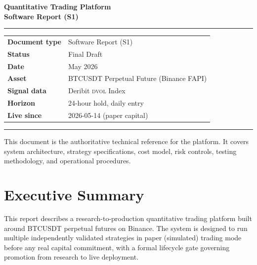 \documentclass[12pt, a4paper]{article}
\theoremstyle{definition}
\newcommand{\DVOL}{\textsc{dvol}}
\begin{document}
\onehalfspacing

\begin{titlepage}
\centering
\vspace*{2cm}

{\Huge\bfseries\color{deepblue}
    Quantitative Trading Platform\\[0.4em]
    \large Software Report (S1)
}

\vspace{1.5cm}
\rule{0.6\linewidth}{0.5pt}

\vspace{1cm}
{\large
\begin{tabular}{ll}
    \textbf{Document type}  & Software Report (S1) \\[4pt]
    \textbf{Status}         & Final Draft \\[4pt]
    \textbf{Date}           & May 2026 \\[4pt]
    \textbf{Asset}          & BTCUSDT Perpetual Future (Binance FAPI) \\[4pt]
    \textbf{Signal data}    & Deribit \DVOL{} Index \\[4pt]
    \textbf{Horizon}        & 24-hour hold, daily entry \\[4pt]
    \textbf{Live since}     & 2026-05-14 (paper capital) \\
\end{tabular}
}

\vspace{1.5cm}
\rule{0.6\linewidth}{0.5pt}
\vfill

{\small
This document is the authoritative technical reference for the platform.
It covers system architecture, strategy specifications, cost model,
risk controls, testing methodology, and operational procedures.
}
\end{titlepage}

\tableofcontents
\newpage

\section{Executive Summary}

This report describes a research-to-production quantitative trading platform
built around BTCUSDT perpetual futures on Binance. The system is designed
to run multiple independently validated strategies in paper (simulated) trading
mode before any real capital commitment, with a formal lifecycle gate governing
promotion from research to live deployment.
\end{document}
